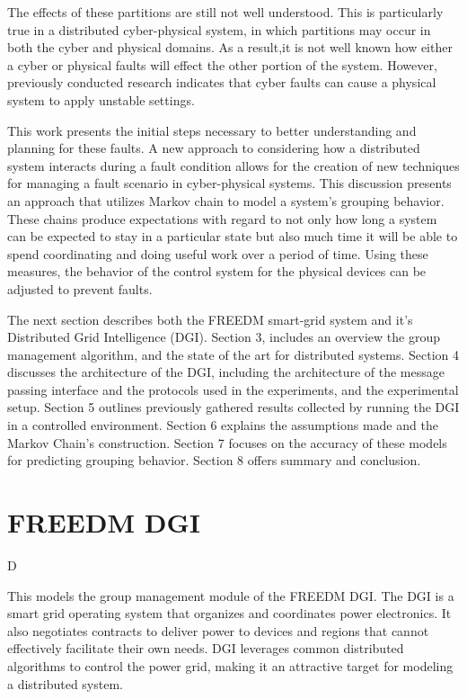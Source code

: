 The effects of these partitions are still not well understood.
This is particularly true in a distributed cyber-physical system, in which partitions may occur in both the cyber and physical domains.
As a result,it is not well known how either a cyber or physical faults will effect the other portion of the system.
However, previously conducted research \cite{HARINI}\cite{TSG} indicates that cyber faults can cause a
physical system to apply unstable settings.

This work presents the initial steps necessary to better understanding and planning for these faults.
A new approach to considering how a distributed system interacts during a fault condition allows for the creation of new techniques for managing a fault scenario in cyber-physical systems. 
This discussion presents an approach that utilizes Markov chain to model a system's grouping behavior.
These chains produce expectations with regard to not only how long a system can be expected to stay in a particular state but also much time it will be able to spend coordinating and doing useful work over a period
of time. 
Using these measures, the behavior of the control system for the physical devices can be adjusted to prevent faults.

The next section describes both the FREEDM smart-grid system and it's Distributed Grid Intelligence (DGI).
Section 3, includes an overview the group management algorithm, and the state of the art for distributed systems.
Section 4 discusses the architecture of the DGI, including the architecture of the message passing interface and the protocols used in the experiments, and the experimental setup.
Section 5 outlines previously gathered results collected by running the DGI in a controlled environment.
Section 6 explains the assumptions made and the Markov Chain's construction. 
Section 7 focuses on the accuracy of these models for predicting grouping behavior.
Section 8 offers summary and conclusion.

\section{FREEDM DGI}D

This models the group management module of the FREEDM DGI.
The DGI is a smart grid operating system that organizes and coordinates power electronics.
It also negotiates contracts to deliver power to devices and regions that cannot effectively facilitate their own needs.
DGI leverages common distributed algorithms to control the power grid, making it an attractive target for modeling a distributed system.

